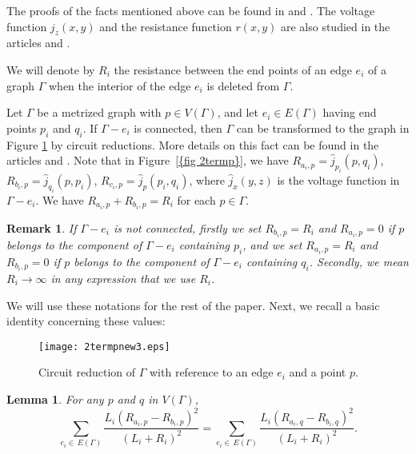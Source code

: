 \documentclass[12pt]{amsart}
\newtheorem{lemma}[theorem]{Lemma}
\theoremstyle{example}
\newtheorem{remark}[theorem]{Remark}
\theoremstyle{definition}
\theoremstyle{notation}
\begin{document}
The proofs of the facts mentioned above can be found in \cite{CR} and \cite[sec 1.5 and sec 6]{BRh}.
The voltage function $j_{z}(x,y)$ and the resistance function $r(x,y)$ are also studied in the articles \cite{BF} and \cite{C1}.

We will denote by $R_i$ the resistance between the end points of an edge $e_i$ of a graph ${\Gamma}$ when the interior of the edge $e_i$ is deleted from ${\Gamma}$.

Let ${\Gamma}$ be a metrized graph with $p \in {V({\Gamma})}$, and let $e_i \in {E({\Gamma})}$ having end points ${p_{i}}$ and ${q_{i}}$.
If ${\Gamma} -e_i$ is connected, then ${\Gamma}$
can be transformed to the graph in Figure \ref{fig 2termp}
by circuit reductions. More details on this fact can be found in the articles \cite{CR} and \cite[Section 2]{C2}.
Note that in {Figure~\ref{{fig 2termp}}}, we have $R_{a_i,p} = {\hat{j}_{{p_{i}}}({p},{q_{i}})}$,
$R_{b_i,p} = {\hat{j}_{{q_{i}}}({p},{p_{i}})}$, $R_{c_i,p} = {\hat{j}_{{p}}({p_{i}},{q_{i}})}$, where ${\hat{j}_{{x}}({y},{z})}$
is the voltage function in ${\Gamma}-e_i$. We have $R_{a_i,p}+R_{b_i,p}={R_{i}}$ for each $p \in {\Gamma}$.
\begin{remark}\label{rem notationRi}
If ${\Gamma}-e_i$ is not connected, firstly we set $R_{b_i,p}={R_{i}}$ and $R_{a_i,p}=0$ if $p$ belongs to the component of ${\Gamma}-e_i$
containing ${p_{i}}$, and we set $R_{a_i,p}={R_{i}}$ and $R_{b_i,p}=0$ if $p$ belongs to the component of ${\Gamma}-e_i$
containing ${q_{i}}$. Secondly, we mean ${R_{i}} \longrightarrow \infty$ in any expression that we use ${R_{i}}$.
\end{remark}
We will use these notations for the rest of the paper. Next, we recall a basic identity concerning these values:
\begin{figure}
\centering
\texttt{[image: 2termpnew3.eps]} \caption{Circuit reduction of ${\Gamma}$ with reference to an edge $e_i$ and a point $p$.} \label{fig 2termp}
\end{figure}

\begin{lemma}\cite[Lemma 2.11]{C4}\label{lemrem2term}
For any $p$ and $q$ in ${V({\Gamma})}$,
 $$\sum_{e_i \in \, {E({\Gamma})}}\frac{{L_{i}}(R_{a_{i},p}-R_{b_{i},p})^2}{({L_{i}}+{R_{i}})^2}
=\sum_{e_i \in \, {E({\Gamma})}}\frac{{L_{i}}(R_{a_{i},q}-R_{b_{i},q})^2}{({L_{i}}+{R_{i}})^2}.$$
\end{lemma}
\end{document}
